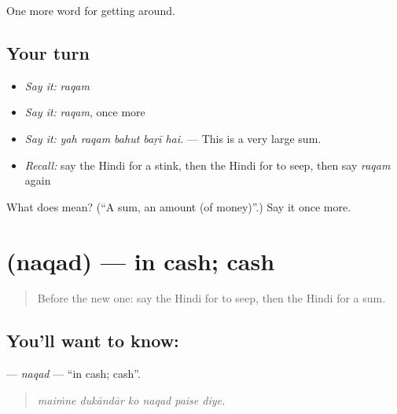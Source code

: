 \begin{grammarlens}[title={What you've built}]
One more word for getting around.
\end{grammarlens}

\subsection*{Your turn}
\begin{itemize}
\raggedright
  \item \emph{Say it:} \emph{raqam}
  \item \emph{Say it:} \emph{raqam}, once more
  \item \emph{Say it:} \emph{yah raqam bahut baṛī hai.} — This is a very large sum.
  \item \emph{Recall:} say the Hindi for a stink, then the Hindi for to seep, then say \emph{raqam} again
\end{itemize}

\begin{tcolorbox}[breakable,colback=teal!4,colframe=teal!35!black,title={Before you move on}]
What does  mean? (\textquotedblleft{}A sum, an amount (of money)\textquotedblright{}.) Say it once more.
\end{tcolorbox}
\section[\texorpdfstring{\hi{नक़द} (naqad)}{नक़द (naqad)}]{ (naqad) — in cash; cash}

\label{lesson:HI-C426-naqad}



\begin{quote}
Before the new one: say the Hindi for to seep, then the Hindi for a sum.
\end{quote}

\subsection*{You'll want to know: }
\textbf{} — \emph{naqad} — \textquotedblleft{}in cash; cash\textquotedblright{}.

\begin{quote}
     
\end{quote}

\begin{quote}
\emph{maiṁne dukāndār ko naqad paise diye.}
\end{quote}

